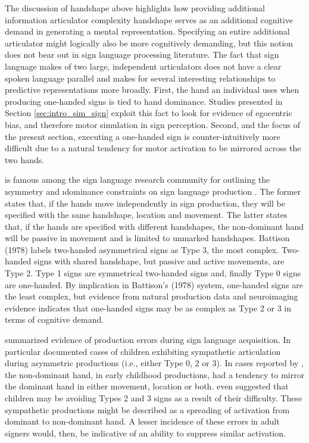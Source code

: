                 \label{sec:intro_sym}
                The discussion of handshape above highlights how providing additional information articulator complexity handshape serves as an additional cognitive demand in generating a mental representation. Specifying an entire additional articulator might logically also be more cognitively demanding, but this notion does not bear out in sign language processing literature. The fact that sign language makes of two large, independent articulators does not have a clear spoken language parallel \cite{shield2018} and makes for several interesting relationships to predictive representations more broadly. First, the hand an individual uses when producing one-handed signs is tied to hand dominance. Studies presented in Section \ref{sec:intro_sim_sign} exploit this fact to look for evidence of egocentric bias, and therefore motor simulation in sign perception. Second, and the focus of the present section, executing a one-handed sign is counter-intuitively more difficult due to a natural tendency for motor activation to be mirrored across the two hands. \par
                 is famous among the sign language research community for outlining the \i{symmetry} and \i{dominance} constraints on sign language production \cite<as cited by>[]{eccarius2007}. The former states that, if the hands move independently in sign production, they will be specified with the same handshape, location and movement. The latter states that, if the hands are specified with different handshapes, the non-dominant hand will be passive in movement and is limited to unmarked handshapes. Battison (1978) labels two-handed asymmetrical signs as Type 3, the most complex. Two-handed signs with shared handshape, but passive and active movements, are Type 2. Type 1 signs are symmetrical two-handed signs and, finally Type 0 signs are one-handed. By implication in Battison’s (1978) system, one-handed signs are the least complex, but evidence from natural production data and neuroimaging evidence indicates that one-handed signs may be as complex as Type 2 or 3 in terms of cognitive demand. \par
                 summarized evidence of production errors during sign language acquisition. In particular  documented cases of children exhibiting sympathetic articulation during asymmetric productions (i.e., either Type 0, 2 or 3).  In cases reported by , the non-dominant hand, in early childhood productions, had a tendency to mirror the dominant hand in either movement, location or both.  even suggested that children may be avoiding Types 2 and 3 signs as a result of their difficulty. These sympathetic productions might be described as a spreading of activation from dominant to non-dominant hand. A lesser incidence of these errors in adult signers would, then, be indicative of an ability to suppress similar activation. \par
